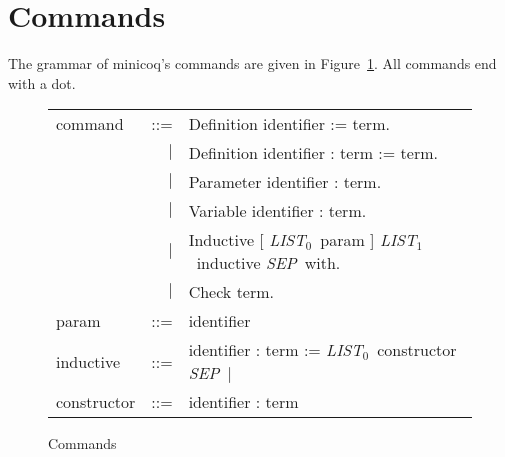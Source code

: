 \documentclass{article}
\newcommand{\minicoq}{\textsf{minicoq}}
\newcommand{\terminal}[1]{\textsf{#1}}
\newcommand{\listzero}{\textit{LIST$_0$}}
\newcommand{\listun}{\textit{LIST$_1$}}
\newcommand{\sep}{\textit{SEP}}
\begin{document}
\section{Commands}
The grammar of \minicoq's commands are given in
Figure~\ref{fig:commands}. All commands end with a dot.

\begin{figure}[htbp]
  \hrulefill
  \begin{center}
    \begin{tabular}{lrl}
      command & ::= & \terminal{Definition} identifier \terminal{:=} term. \\
              & $|$ & \terminal{Definition} identifier \terminal{:} term
                      \terminal{:=} term. \\
              & $|$ & \terminal{Parameter} identifier \terminal{:} term. \\
              & $|$ & \terminal{Variable} identifier \terminal{:} term. \\
              & $|$ & \terminal{Inductive} \terminal{[} \listzero\ param
                      \terminal{]} \listun\ inductive \sep\
                      \terminal{with}. \\
              & $|$ & \terminal{Check} term.
      \\[1em]
      param   & ::= & identifier
      \\[1em]
      inductive & ::= & identifier \terminal{:} term \terminal{:=}
                        \listzero\ constructor \sep\ \terminal{$|$}
      \\[1em]
      constructor & ::= & identifier \terminal{:} term
    \end{tabular}
  \end{center}
  \hrulefill
  \caption{Commands}
  \label{fig:commands}
\end{figure}
\end{document}

